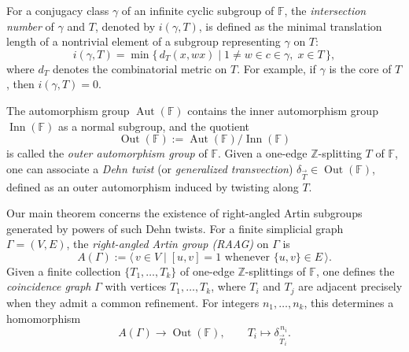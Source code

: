 \documentclass[12pt,a4paper]{amsart}
\numberwithin{equation}{section}
\DeclareMathOperator{\Out}{Out}
\DeclareMathOperator{\Aut}{Aut}
\DeclareMathOperator{\Inn}{Inn}
\newcommand{\FF}{\mathbb{F}}
\theoremstyle{plain}
\theoremstyle{definition}
\theoremstyle{remark}
\begin{document}
For a conjugacy class $\gamma$ of an infinite cyclic subgroup of $\mathbb{F}$, the \emph{intersection number} of $\gamma$ and $T$, denoted by $i(\gamma, T)$, is defined as the minimal translation length of a nontrivial element of a subgroup representing $\gamma$ on $T$:
\[
    i(\gamma, T)
    = \min\{\, d_T(x, wx) \mid 1 \neq w \in c \in \gamma,\; x \in T \,\},
\]
where $d_T$ denotes the combinatorial metric on $T$.
For example, if $\gamma$ is the core of $T$, then $i(\gamma, T) = 0$.



The automorphism group $\Aut(\mathbb{F})$ contains the inner automorphism group
$\Inn(\mathbb{F})$ as a normal subgroup, and the quotient
\[
    \Out(\mathbb{F}) := \Aut(\mathbb{F}) / \Inn(\mathbb{F})
\]
is called the \emph{outer automorphism group} of $\mathbb{F}$.
Given a one-edge $\mathbb{Z}$-splitting $T$ of $\mathbb{F}$, one can associate a \emph{Dehn twist} (or \emph{generalized transvection}) $\delta_{\vec{T}} \in \Out(\mathbb{F})$, defined as an outer automorphism induced by twisting along $T$.

Our main theorem concerns the existence of right-angled Artin subgroups generated by powers of such Dehn twists.
For a finite simplicial graph $\Gamma = (V, E)$, the \emph{right-angled Artin group (RAAG)} on $\Gamma$ is
\[
    A(\Gamma) := \langle\, v \in V \mid [u,v] = 1 \text{ whenever } \{u,v\} \in E \,\rangle.
\]
Given a finite collection $\{T_1,\dots,T_k\}$ of one-edge $\mathbb{Z}$-splittings of $\mathbb{F}$, one defines the \emph{coincidence graph} $\Gamma$ with vertices $T_1,\dots,T_k$, where $T_i$ and $T_j$ are adjacent precisely when they admit a common refinement.
For integers $n_1,\dots,n_k$, this determines a homomorphism
\[
    A(\Gamma) \longrightarrow \Out(\mathbb{F}), \qquad T_i \longmapsto \delta_{\vec{T}_i}^{\,n_i}.
\]
\end{document}
